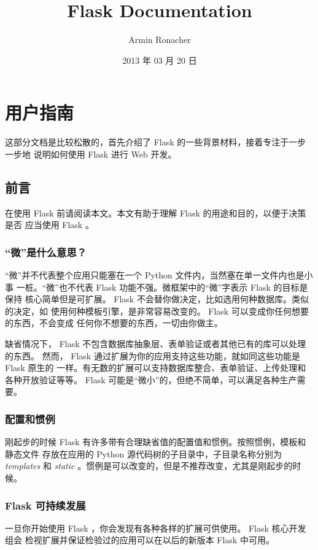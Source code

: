 \documentclass[a4paper,12pt]{sphinxmanual}
\title{Flask Documentation}
\date{2013 年 03 月 20 日}
\author{Armin Ronacher}
\begin{document}
\maketitle
\tableofcontents
{}\label{latexindex::doc}



\part{用户指南}
\label{latexindex:flask-documentation}\label{latexindex:id1}
这部分文档是比较松散的，首先介绍了 Flask 的一些背景材料，接着专注于一步一步地
说明如何使用 Flask 进行 Web 开发。


\chapter{前言}
\label{foreword::doc}\label{foreword:id1}
在使用 Flask 前请阅读本文。本文有助于理解 Flask 的用途和目的，以便于决策是否
应当使用 Flask 。


\section{“微”是什么意思？}
\label{foreword:id2}
“微”并不代表整个应用只能塞在一个 Python 文件内，当然塞在单一文件内也是小事
一桩。“微”也不代表 Flask 功能不强。微框架中的“微”字表示 Flask 的目标是保持
核心简单但是可扩展。 Flask 不会替你做决定，比如选用何种数据库。类似的决定，如
使用何种模板引擎，是非常容易改变的。 Flask 可以变成你任何想要的东西，不会变成
任何你不想要的东西，一切由你做主。

缺省情况下， Flask 不包含数据库抽象层、表单验证或者其他已有的库可以处理的东西。
然而， Flask 通过扩展为你的应用支持这些功能，就如同这些功能是 Flask 原生的
一样。有无数的扩展可以支持数据库整合、表单验证、上传处理和各种开放验证等等。
Flask 可能是“微小”的，但绝不简单，可以满足各种生产需要。


\section{配置和惯例}
\label{foreword:id3}
刚起步的时候 Flask 有许多带有合理缺省值的配置值和惯例。按照惯例，模板和静态文件
存放在应用的 Python 源代码树的子目录中，子目录名称分别为 \emph{templates} 和
\emph{static} 。惯例是可以改变的，但是不推荐改变，尤其是刚起步的时候。


\section{Flask 可持续发展}
\label{foreword:flask}
一旦你开始使用 Flask ，你会发现有各种各样的扩展可供使用。 Flask 核心开发组会
检视扩展并保证检验过的应用可以在以后的新版本 Flask 中可用。
\end{document}

